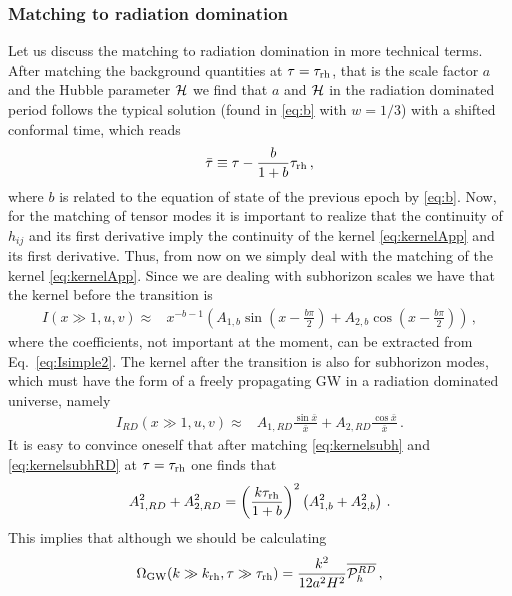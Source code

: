 \documentclass[a4paper,11pt]{article}
\numberwithin{equation}{section}
\begin{document}
\subsubsection{Matching to radiation domination}

Let us discuss the matching to radiation domination in more technical terms. After matching the background quantities at $\tau=\tau_{\rm rh}$, that is the scale factor $a$ and the Hubble parameter ${\cal H}$ we find that $a$ and ${\cal H}$ in the radiation dominated period follows the typical solution (found in \eqref{eq:b} with $w=1/3$) with a shifted conformal time, which reads
\begin{align}\label{eq:bartau}
\bar\tau\equiv\tau-\frac{b}{1+b}\tau_{\rm rh}\,,
\end{align}
where $b$ is related to the equation of state of the previous epoch by \eqref{eq:b}. Now, for the matching of tensor modes it is important to realize that the continuity of $h_{ij}$ and its first derivative imply the continuity of the kernel \eqref{eq:kernelApp} and its first derivative. Thus, from now on we simply deal with the matching of the kernel \eqref{eq:kernelApp}. Since we are dealing with subhorizon scales we have that the kernel before the transition is
\begin{align}\label{eq:kernelsubh}
I(x\gg1,u,v)\approx & x^{-b-1}\left(A_{1,b}\sin\left(x-\frac{b\pi}{2}\right)+A_{2,b}\cos\left(x-\frac{b\pi}{2}\right)\right)\,,
\end{align}
where the coefficients, not important at the moment, can be extracted from Eq.~\eqref{eq:Isimple2}. The kernel after the transition is also for subhorizon modes, which must have the form of a freely propagating GW in a radiation dominated universe, namely
\begin{align}\label{eq:kernelsubhRD}
I_{RD}(x\gg1,u,v)\approx & A_{1,RD}\frac{\sin \bar x}{\bar x}+A_{2,RD}\frac{\cos \bar x}{\bar x}\,.
\end{align}
It is easy to convince oneself that after matching \eqref{eq:kernelsubh} and \eqref{eq:kernelsubhRD} at $\tau=\tau_{\rm rh}$ one finds that
\begin{align}
A_{1,RD}^2+A_{2,RD}^2=\left(\frac{k\tau_{\rm rh}}{1+b}\right)^2\left(A_{1,b}^2+A_{2,b}^2\right)\,.
\end{align}
This implies that although we should be calculating 
\begin{equation}\label{eq:spectraldensitysubRD}
\Omega_{\rm GW}(k\gg k_{\rm rh}, \tau\gg \tau_{\rm rh})=\frac{k^2}{12a^2H^2}\overline{{\cal P}^{RD}_{h}}\,,
\end{equation}
\end{document}
